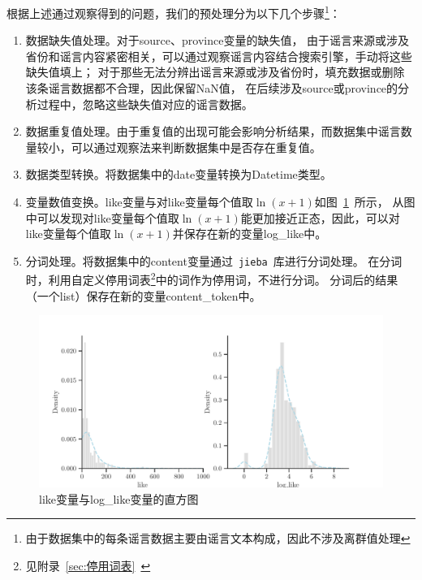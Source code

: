 \documentclass[UTF8]{ctexart}
\begin{document}
根据上述通过观察得到的问题，我们的预处理分为以下几个步骤\footnote{由于数据集中的每条谣言数据主要由谣言文本构成，因此不涉及离群值处理}：
\begin{enumerate}
    \item 数据缺失值处理。对于source、province变量的缺失值，
    由于谣言来源或涉及省份和谣言内容紧密相关，可以通过观察谣言内容结合搜索引擎，手动将这些缺失值填上；
    对于那些无法分辨出谣言来源或涉及省份时，填充数据或删除该条谣言数据都不合理，因此保留NaN值，
    在后续涉及source或province的分析过程中，忽略这些缺失值对应的谣言数据。
    \item 数据重复值处理。由于重复值的出现可能会影响分析结果，而数据集中谣言数量较小，可以通过观察法来判断数据集中是否存在重复值。
    \item 数据类型转换。将数据集中的date变量转换为Datetime类型。 %
    \item 变量数值变换。like变量与对like变量每个值取$\ln(x+1)$如图~\ref{fig:like_loglike_hist}~所示，
    从图中可以发现对like变量每个值取$\ln(x+1)$能更加接近正态，因此，可以对like变量每个值取$\ln(x+1)$并保存在新的变量log\_like中。
    \item 分词处理。将数据集中的content变量通过~\verb|jieba|~库进行分词处理。
    在分词时，利用自定义停用词表\footnote{见附录~\ref{sec:停用词表}~}中的词作为停用词，不进行分词。
    分词后的结果（一个list）保存在新的变量content\_token中。 %
\end{enumerate}

\begin{figure}[!ht]
    \includegraphics[width=\linewidth]{../figures/loglike_like_hist.pdf}
    \caption{like变量与log\_like变量的直方图}
    \label{fig:like_loglike_hist}
\end{figure}
\end{document}

